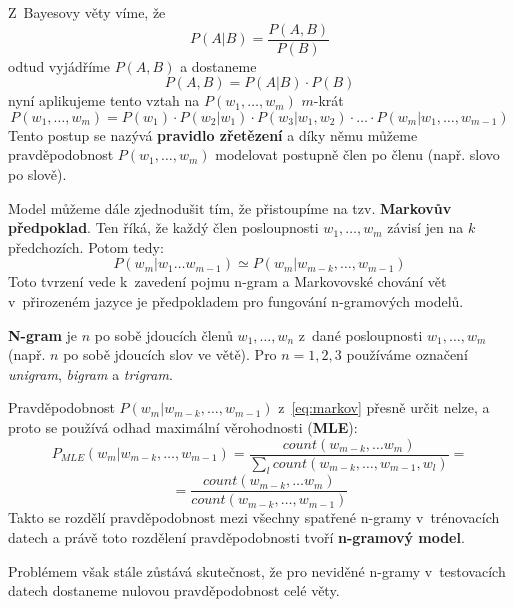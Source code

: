 \documentclass[12pt,a4paper]{report}
\begin{document}
Z~Bayesovy věty víme, že
\begin{equation}
P(A|B) = \frac{P(A,B)}{P(B)}
\end{equation}
odtud vyjádříme $P(A,B)$ a dostaneme
\begin{equation}
P(A,B) = P(A|B) \cdot P(B)
\end{equation}
nyní aplikujeme tento vztah na $P(w_{1},\ldots,w_{m})$ $m$-krát
\begin{equation}
P(w_{1},\ldots,w_{m}) = P(w_{1}) \cdot P(w_{2}|w_{1}) \cdot P(w_{3}|w_{1},w_{2}) \cdot \ldots \cdot P(w_{m}|w_{1},\ldots,w_{m-1})
\end{equation}
Tento postup se nazývá \textbf{pravidlo zřetězení} a díky němu můžeme pravděpodobnost $P(w_{1},\ldots,w_{m})$ modelovat postupně člen po členu (např. slovo po slově).

Model můžeme dále zjednodušit tím, že přistoupíme na tzv. \textbf{Markovův předpoklad}. Ten říká, že každý člen posloupnosti $w_{1},\ldots,w_{m}$ závisí jen na $k$ předchozích. Potom tedy:
\begin{equation}\label{eq:markov}
P(w_{m}|w_{1} \ldots w_{m-1}) \simeq P(w_{m}|w_{m-k}, \ldots, w_{m-1})
\end{equation}
Toto tvrzení vede k~zavedení pojmu n-gram a Markovovské chování vět v~přirozeném jazyce je předpokladem pro fungování n-gramových modelů.

\textbf{N-gram} je $n$ po sobě jdoucích členů $w_{1},\ldots,w_{n}$ z~dané posloupnosti $w_{1},\ldots,w_{m}$ (např. $n$ po sobě jdoucích slov ve větě). Pro $n = 1, 2, 3$ používáme označení \textit{unigram}, \textit{bigram} a \textit{trigram}.

Pravděpodobnost $P(w_{m}|w_{m-k}, \ldots, w_{m-1})$ z~\eqref{eq:markov} přesně určit nelze, a proto se používá odhad maximální věrohodnosti (\textbf{MLE}):
\begin{equation}\label{eq:pmle}
P_{MLE}(w_{m}|w_{m-k}, \ldots, w_{m-1}) = \frac{count(w_{m-k}, \ldots w_{m})}{\sum_{l} count(w_{m-k},\ldots,w_{m-1}, w_{l})} =
\end{equation}
\begin{equation}\nonumber
= \frac{count(w_{m-k}, \ldots w_{m})}{count(w_{m-k},\ldots,w_{m-1})}
\end{equation}
Takto se rozdělí pravděpodobnost mezi všechny spatřené n-gramy v~trénovacích datech a právě toto rozdělení pravděpodobnosti tvoří \textbf{n-gramový model}.

Problémem však stále zůstává skutečnost, že pro neviděné n-gramy v~testovacích datech dostaneme nulovou pravděpodobnost celé věty.
\end{document}
